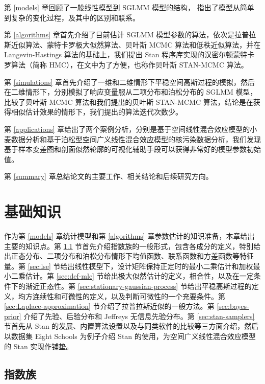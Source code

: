 \documentclass[12pt,a4paper,UTF8,twoside]{book}
\theoremstyle{definition}
\theoremstyle{definition}
\theoremstyle{definition}
\theoremstyle{remark}
\begin{document}
第 \ref{models} 章回顾了一般线性模型到 SGLMM 模型的结构，
指出了模型从简单到复杂的变化过程，及其中的区别和联系。

第 \ref{algorithms} 章首先介绍了目前估计 SGLMM
模型参数的算法，依次是拉普拉斯近似算法、蒙特卡罗极大似然算法、贝叶斯
MCMC 算法和低秩近似算法，并在 Langevin-Hastings 算法的基础上，我们提出
Stan 程序库实现的汉密尔顿蒙特卡罗算法（简称
HMC），在文中为了方便，也称作贝叶斯 STAN-MCMC 算法。

第 \ref{simulations}
章首先介绍了一维和二维情形下平稳空间高斯过程的模拟，然后在二维情形下，分别模拟了响应变量服从二项分布和泊松分布的
SGLMM 模型，比较了贝叶斯 MCMC 算法和我们提出的贝叶斯 STAN-MCMC
算法，结论是在获得相似估计效果的情形下，我们提出的算法迭代次数少。

第 \ref{applications}
章给出了两个案例分析，分别是基于空间线性混合效应模型的小麦数据分析和基于泊松型空间广义线性混合效应模型的核污染数据分析，我们发现基于样本变差图和剖面似然轮廓的可视化辅助手段可以获得非常好的模型参数初始值。

第 \ref{summary} 章总结论文的主要工作、相关结论和后续研究方向。

\hypertarget{prepare}{%
\chapter{基础知识}\label{prepare}}

作为第 \ref{models} 章统计模型和第 \ref{algorithms}
章参数估计的知识准备，本章给出主要的知识点。第 \ref{sec:exp}
节首先介绍指数族的一般形式，包含各成分的定义，特别给出正态分布、二项分布和泊松分布情形下均值函数、联系函数和方差函数等特征量。第
\ref{sec:lse}
节给出线性模型下，设计矩阵保持正定时的最小二乘估计和加权最小二乘估计。第
\ref{sec:def-mle}
节给出极大似然估计的定义，相合性，以及在一定条件下的渐近正态性。第
\ref{sec:stationary-gaussian-process}
节给出平稳高斯过程的定义，均方连续性和可微性的定义，以及判断可微性的一个充要条件。第
\ref{sec:Laplace-approximation} 节介绍了拉普拉斯近似的一般方法。第
\ref{sec:bayes-prior} 介绍了先验、后验分布和 Jeffreys 无信息先验分布。第
\ref{sec:stan-samplers} 节首先从 Stan
的发展、内置算法设置以及与同类软件的比较等三方面介绍，然后以数据集 Eight
Schools 为例子介绍 Stan 的使用，为空间广义线性混合效应模型的 Stan
实现作铺垫。

\hypertarget{sec:exp}{%
\section{指数族}\label{sec:exp}}
\end{document}
